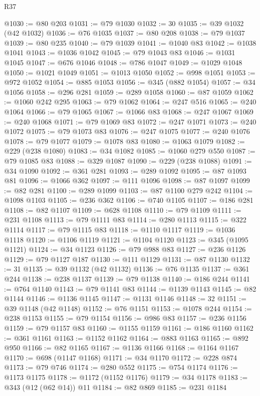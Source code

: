 \begin{lexlean}{R37}
\begin{coremodule}
@1030 := @80 @203
@1031 := @79 @1030
@1032 := 30
@1035 := @39 @1032 (@42 @1032)
@1036 := @76 @1035
@1037 := @80 @208
@1038 := @79 @1037
@1039 := @80 @235
@1040 := @79 @1039
@1041 := @1040 @83
@1042 := @1038 @1041
@1043 := @1036 @1042
@1045 := @79 @1043 @83
@1046 := @1031 @1045
@1047 := @676 @1046
@1048 := @786 @1047
@1049 := @1029 @1048
@1050 := @1021 @1049
@1051 := @1013 @1050
@1052 := @998 @1051
@1053 := @972 @1052
@1054 := @885 @1053
@1056 := @345 (@882 @1054)
@1057 := @34 @1056
@1058 := @296 @281
@1059 := @289 @1058
@1060 := @87 @1059
@1062 := @1060 @242 @295
@1063 := @79 @1062
@1064 := @247 @516
@1065 := @240 @1064
@1066 := @79 @1065
@1067 := @1066 @83
@1068 := @247 @1067
@1069 := @240 @1068
@1071 := @79 @1069 @83
@1072 := @247 @1071
@1073 := @240 @1072
@1075 := @79 @1073 @83
@1076 := @247 @1075
@1077 := @240 @1076
@1078 := @79 @1077
@1079 := @1078 @83
@1080 := @1063 @1079
@1082 := @229 (@238 @1080)
@1083 := @34 @1082
@1085 := @1060 @279 @550
@1087 := @79 @1085 @83
@1088 := @329 @1087
@1090 := @229 (@238 @1088)
@1091 := @34 @1090
@1092 := @361 @281
@1093 := @289 @1092
@1095 := @87 @1093 @81
@1096 := @1066 @362
@1097 := @111 @1096
@1098 := @87 @1097
@1099 := @82 @281
@1100 := @289 @1099
@1103 := @87 @1100 @279 @242
@1104 := @1098 @1103
@1105 := @236 @362
@1106 := @740 @1105
@1107 := @186 @281
@1108 := @82 @1107
@1109 := @628 @1108
@1110 := @79 @1109
@1111 := @231 @1108
@1113 := @79 @1111 @83
@1114 := @280 @1113
@1115 := @322 @1114
@1117 := @79 @1115 @83
@1118 := @1110 @1117
@1119 := @1036 @1118
@1120 := @1106 @1119
@1121 := @1104 @1120
@1123 := @345 (@1095 @1121)
@1124 := @34 @1123
@1126 := @79 @988 @83
@1127 := @236 @1126
@1129 := @79 @1127 @187
@1130 := @111 @1129
@1131 := @87 @1130
@1132 := 31
@1135 := @39 @1132 (@42 @1132)
@1136 := @76 @1135
@1137 := @361 @244
@1138 := @238 @1137
@1139 := @79 @1138
@1140 := @186 @244
@1141 := @764 @1140
@1143 := @79 @1141 @83
@1144 := @1139 @1143
@1145 := @82 @1144
@1146 := @1136 @1145
@1147 := @1131 @1146
@1148 := 32
@1151 := @39 @1148 (@42 @1148)
@1152 := @76 @1151
@1153 := @1078 @244
@1154 := @238 @1153
@1155 := @79 @1154
@1156 := @986 @83
@1157 := @236 @1156
@1159 := @79 @1157 @83
@1160 := @1155 @1159
@1161 := @186 @1160
@1162 := @361 @1161
@1163 := @1152 @1162
@1164 := @883 @1163
@1165 := @892 @950
@1166 := @82 @1165
@1167 := @1136 @1166
@1168 := @1164 @1167
@1170 := @698 (@1147 @1168)
@1171 := @34 @1170
@1172 := @228 @874
@1173 := @79 @746
@1174 := @280 @552
@1175 := @754 @1174
@1176 := @1173 @1175
@1178 := @1172 (@1152 @1176)
@1179 := @34 @1178
@1183 := @343 (@12 (@62 @14)) @11
@1184 := @82 @869
@1185 := @231 @1184

\end{coremodule}
\end{lexlean}
